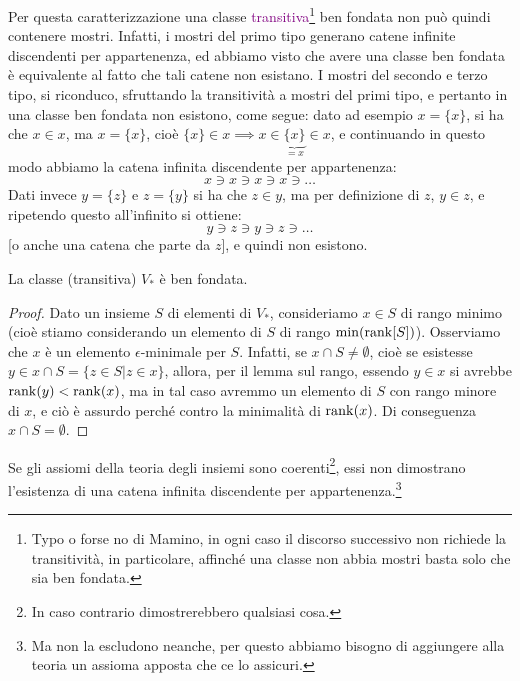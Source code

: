 Per questa caratterizzazione una classe \textcolor{purple}{transitiva}\footnote{Typo o forse no di Mamino, in ogni caso il discorso successivo non richiede la transitivit\`a, in particolare, affinch\'e una classe non abbia mostri basta solo che sia ben fondata.} ben fondata non pu\`o quindi contenere mostri. Infatti, i mostri del primo tipo generano catene infinite discendenti per appartenenza, ed abbiamo visto che avere una classe ben fondata \`e equivalente al fatto che tali catene non esistano.
I mostri del secondo e terzo tipo, si riconduco, sfruttando la transitivit\`a a mostri del primi tipo, e pertanto in una classe ben fondata non esistono, come segue: dato ad esempio $x = \{x\}$, si ha che $x \in x$, ma $x = \{x\}$, cio\`e $\{x\} \in x \implies x \in \underbrace{\{x\}}_{= x} \in x$, e continuando in questo modo abbiamo la catena infinita discendente per appartenenza:
\[ x \ni x \ni x \ni x \ni \ldots
	\]
Dati invece $y = \{z\}$ e $z = \{y\}$ si ha che $z \in y$, ma per definizione di $z$, $y \in z$, e ripetendo questo all'infinito si ottiene:
\[  y \ni z \ni y \ni z \ni \ldots
	\]
[o anche una catena che parte da $z$], e quindi non esistono.

\begin{proposition}
	La classe (transitiva) $V_*$ \`e ben fondata.
\end{proposition}

\begin{proof}
	Dato un insieme $S$ di elementi di $V_*$, consideriamo $x \in S$ di rango minimo (cio\`e stiamo considerando un elemento di $S$ di rango $\min(\operatorname{rank}[S])$). Osserviamo che $x$ \`e un elemento $\epsilon$-minimale per $S$.
	Infatti, se $x \cap S \ne \emptyset$, cio\`e se esistesse $y \in x \cap S = \{z \in S | z \in x\}$, allora, per il lemma sul rango, essendo $y \in x$ si avrebbe $\operatorname{rank}(y) < \operatorname{rank}(x)$, ma in tal caso avremmo un elemento di $S$ con rango minore di $x$, e ci\`o \`e assurdo perch\'e contro la minimalit\`a di $\operatorname{rank}(x)$.
	Di conseguenza $x \cap S = \emptyset$.
\end{proof}

\begin{theorem}
	Se gli assiomi della teoria degli insiemi sono coerenti\footnote{In caso contrario dimostrerebbero qualsiasi cosa.}, essi non dimostrano l'esistenza di una catena infinita discendente per appartenenza.\footnote{Ma non la escludono neanche, per questo abbiamo bisogno di aggiungere alla teoria un assioma apposta che ce lo assicuri.}
\end{theorem}

